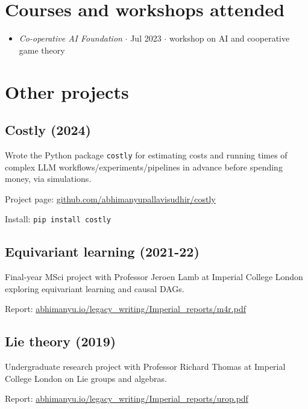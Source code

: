 \documentclass{article}
\begin{document}
\section*{Courses and workshops attended}

\begin{itemize}

    \item \emph{Co-operative AI Foundation} $\cdot$ Jul 2023 $\cdot$ workshop on AI and cooperative game theory

\end{itemize}

\section*{Other projects}

\subsection*{Costly (2024)}

Wrote the Python package \texttt{costly} for estimating costs and running times of complex LLM workflows/experiments/pipelines in advance before spending money, via simulations.

Project page: \href{https://github.com/abhimanyupallavisudhir/costly}{github.com/abhimanyupallavisudhir/costly}

Install: \texttt{pip install costly}

\subsection*{Equivariant learning (2021-22)}

Final-year MSci project with Professor Jeroen Lamb at Imperial College London exploring equivariant learning and causal DAGs.

Report: \href{https://abhimanyu.io/legacy_writing/Imperial_reports/m4r.pdf}{abhimanyu.io/legacy\_writing/Imperial\_reports/m4r.pdf}

\subsection*{Lie theory (2019)}

Undergraduate research project with Professor Richard Thomas at Imperial College London on Lie groups and algebras.

Report: \href{https://abhimanyu.io/legacy_writing/Imperial_reports/urop.pdf}{abhimanyu.io/legacy\_writing/Imperial\_reports/urop.pdf}
\end{document}
